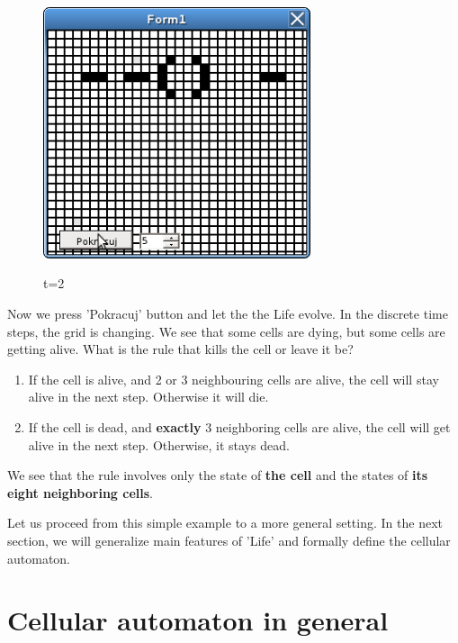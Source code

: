 \begin{figure}
 \centering
 \includegraphics[width=0.7\textwidth]{./img/gol3}
 \label{gol2}
 \caption{t=2}
\end{figure}

Now we press 'Pokracuj' button and let the the Life evolve.
In the discrete time steps, the grid is changing.
We see that some cells are dying, but some cells are getting alive. 
What is the rule that kills the cell or leave it be? 

\begin{enumerate}
\item If the cell is alive, and 2 or 3 neighbouring cells are alive, the cell will stay alive in the next step. Otherwise it will die.
\item If the cell is dead, and \textbf{exactly} 3 neighboring cells are alive, the cell will get alive in the next step. Otherwise, it stays dead.

\end{enumerate}
We see that the rule involves only the state of \textbf{the cell} and the states of \textbf{its eight neighboring cells}.

\bigskip

Let us proceed from this simple example to a more general setting.
In the next section, we will generalize main features of 'Life' and formally define the cellular automaton.

\section{Cellular automaton in general}


